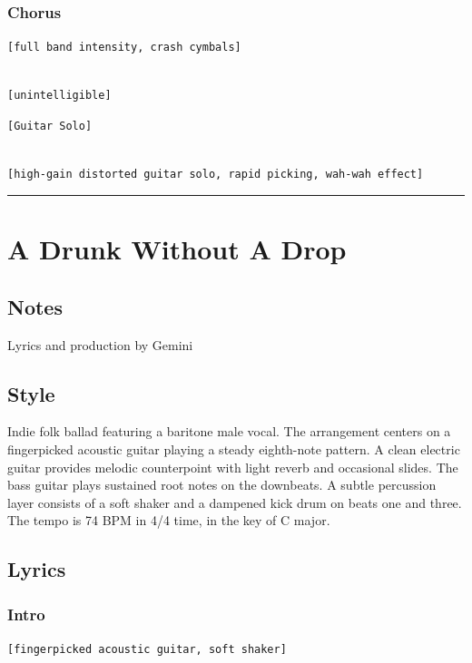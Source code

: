 \documentclass[]{article}
\begin{document}
\subsubsection{Chorus}\label{chorus-4}

\texttt{{[}full\ band\ intensity,\ crash\ cymbals{]}}\strut \\
\texttt{{[}unintelligible{]}}

\texttt{{[}Guitar\ Solo{]}}\strut \\
\texttt{{[}high-gain\ distorted\ guitar\ solo,\ rapid\ picking,\ wah-wah\ effect{]}}

\begin{center}\rule{0.5\linewidth}{0.5pt}\end{center}

\section{A Drunk Without A Drop}\label{a-drunk-without-a-drop}

\subsection{Notes}\label{notes-7}

Lyrics and production by Gemini

\subsection{Style}\label{style-7}

Indie folk ballad featuring a baritone male vocal. The arrangement
centers on a fingerpicked acoustic guitar playing a steady eighth-note
pattern. A clean electric guitar provides melodic counterpoint with
light reverb and occasional slides. The bass guitar plays sustained root
notes on the downbeats. A subtle percussion layer consists of a soft
shaker and a dampened kick drum on beats one and three. The tempo is 74
BPM in 4/4 time, in the key of C major.

\subsection{Lyrics}\label{lyrics-7}

\subsubsection{Intro}\label{intro-1}

\texttt{{[}fingerpicked\ acoustic\ guitar,\ soft\ shaker{]}}
\end{document}
